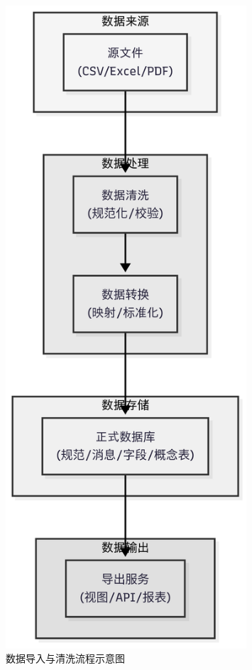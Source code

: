 \begin{figure}[H]
    \centering
    \includegraphics[width=0.8\textwidth,height=0.33\textheight,keepaspectratio]{chapters/fig-0/data-import.png}
    \caption{数据导入与清洗流程示意图}
    \label{fig_data_import}
\end{figure}

